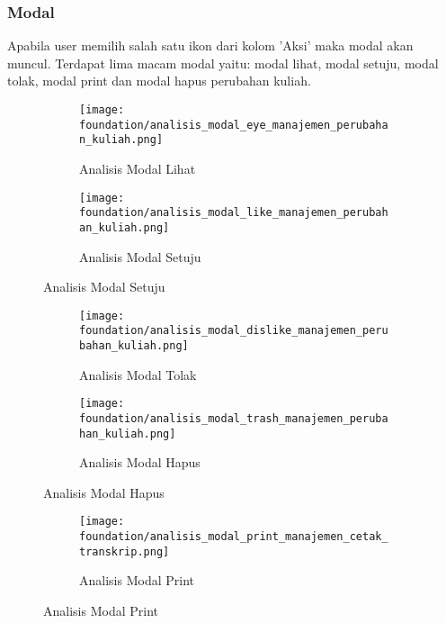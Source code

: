 \subsubsection{Modal}
Apabila user memilih salah satu ikon dari kolom 'Aksi' maka modal akan muncul. Terdapat lima macam modal yaitu: modal lihat, modal setuju, modal tolak, modal print dan modal hapus perubahan kuliah. 
\begin{figure} [H]	
	\centering
	\begin{subfigure}[t]{7in}
		\centering  
		\texttt{[image: foundation/analisis\_modal\_eye\_manajemen\_perubahan\_kuliah.png]}
		\caption{Analisis Modal Lihat}  
	\end{subfigure}
	
	\begin{subfigure}[t]{7in}		  
		\centering  
		\texttt{[image: foundation/analisis\_modal\_like\_manajemen\_perubahan\_kuliah.png]}
		\caption{Analisis Modal Setuju}
	\end{subfigure}
\end{figure}
\begin{figure} [H]	
	\centering
	\begin{subfigure}[t]{7in}
		\centering 
		\texttt{[image: foundation/analisis\_modal\_dislike\_manajemen\_perubahan\_kuliah.png]}
		\caption{Analisis Modal Tolak}  
	\end{subfigure}	
	\begin{subfigure}[t]{7in}		  
		\centering  
		\texttt{[image: foundation/analisis\_modal\_trash\_manajemen\_perubahan\_kuliah.png]}
		\caption{Analisis Modal Hapus}
	\end{subfigure}
\end{figure}
\begin{figure} [H]	
	\centering
	\begin{subfigure}[t]{7in}
		\centering 
		\texttt{[image: foundation/analisis\_modal\_print\_manajemen\_cetak\_transkrip.png]}
		\caption{Analisis Modal Print}  
	\end{subfigure}	
\end{figure}

